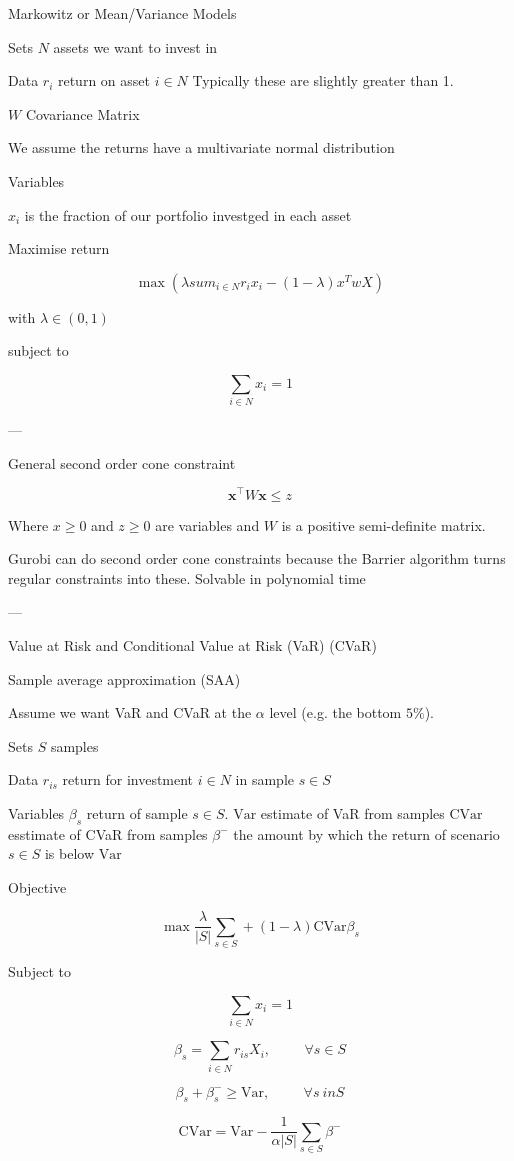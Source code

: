 Markowitz or Mean/Variance Models

Sets
$N$ assets we want to invest in

Data
$r_i$ return on asset $i \in N$
Typically these are slightly greater than 1.

$W$ Covariance Matrix

We assume the returns have a multivariate normal distribution

Variables

$x_i$ is the fraction of our portfolio investged in each asset

Maximise return

\[\max (\lambda sum_{i\in N} r_i x_i - (1-\lambda) x^T w X)\]

with
$\lambda \in (0,1)$

subject to

\[\sum_{i\in N} x_i = 1\]

---

General second order cone constraint

\[\boldsymbol{x}^\top W \boldsymbol{x} \le z\]

Where $x\ge 0$ and $z \ge 0$ are variables and $W$ is a positive semi-definite matrix.



Gurobi can do second order cone constraints because the Barrier algorithm turns regular constraints into these.
Solvable in polynomial time

---

Value at Risk and Conditional Value at Risk
(VaR) (CVaR)

Sample average approximation (SAA)

Assume we want VaR and CVaR at the $\alpha$ level (e.g. the bottom $5\%$).

Sets
$S$ samples

Data
$r_{is}$ return for investment $i \in N$ in sample $s \in S$

Variables
$\beta_s$ return of sample $s \in S$.
$\text{Var}$ estimate of VaR from samples
$\text{CVar}$ esstimate of CVaR from samples
$\beta^{-}$ the amount by which the return of scenario $s \in S$ is below $\text{Var}$

Objective

\[ \max \frac{\lambda}{|S|} \sum_{s \in S} + (1 - \lambda)\text{CVar} \beta_s \]

Subject to

\[ \sum_{i\in N} x_i = 1 \]

\[ \beta_s = \sum_{ i \in N } r_{is} X_i, \hspace{1cm} \forall s \in S \]

\[ \beta_s + \beta_s^{-} \ge \text{Var}, \hspace{1cm} \forall s \ in S \]

\[ \text{CVar} = \text{Var} - \frac{1}{\alpha |S|} \sum_{s \in S} \beta^{-} \]

